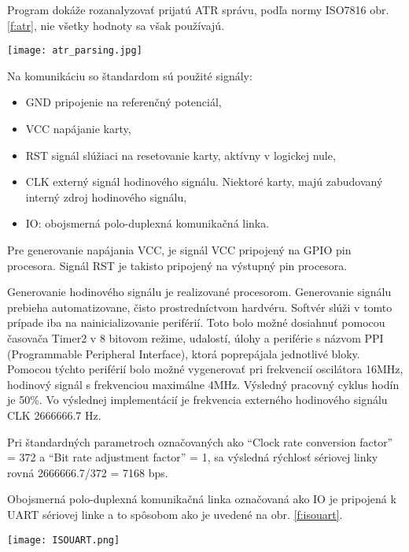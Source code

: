 \documentclass[12pt,a4paper,oneside,openright]{report}
\newcommand{\quotes}[1]{``#1''}
\begin{document}
	Program dokáže rozanalyzovať prijatú ATR správu, podľa normy ISO7816 obr. \ref{f:atr}, nie všetky hodnoty sa však používajú.

	\begin{figure*}[h]
		\centering
		\texttt{[image: atr\_parsing.jpg]}
		\caption{Analyzovanie ATR (Answer to reset) správy po pripojení smart karty\cite{smartcard}.}
		\label{f:atr}
	\end{figure*}

	Na komunikáciu so štandardom sú použité signály:
		\singlespacing
	\begin{itemize}
		\item GND pripojenie na referenčný potenciál,
		\item VCC napájanie karty,
		\item RST signál slúžiaci na resetovanie karty, aktívny v logickej nule,
		\item CLK externý signál hodinového signálu. Niektoré karty, majú zabudovaný interný zdroj hodinového signálu,
		\item IO: obojsmerná polo-duplexná komunikačná linka.
	\end{itemize}
	\onehalfspacing
	
	Pre generovanie napájania VCC, je signál VCC pripojený na GPIO pin procesora.
	Signál RST je takisto pripojený na výstupný pin procesora.
	
	Generovanie hodinového signálu je realizované procesorom. Generovanie signálu prebieha automatizovane, čisto prostredníctvom hardvéru. Softvér slúži v tomto prípade iba na nainicializovanie periférií. Toto bolo možné dosiahnuť pomocou časovača Timer2 v 8 bitovom režime, udalostí, úlohy a periférie s názvom PPI (Programmable Peripheral Interface), ktorá poprepájala jednotlivé bloky. Pomocou týchto periférií bolo možné vygenerovať pri frekvencií oscilátora 16MHz, hodinový signál s frekvenciou maximálne 4MHz. Výsledný pracovný cyklus hodín je 50\%. Vo výslednej implementácií je frekvencia externého hodinového signálu CLK 2666666.7 Hz.

	Pri štandardných parametroch označovaných ako \quotes{Clock rate conversion factor} = 372 a \quotes{Bit rate adjustment factor} = 1, sa výsledná rýchlosť sériovej linky rovná 2666666.7/372 = 7168 bps.

	Obojsmerná polo-duplexná komunikačná linka označovaná ako IO je pripojená k UART sériovej linke a to spôsobom ako je uvedené na obr. \ref{f:isouart}.

	\begin{figure*}[h]
		\centering
		\texttt{[image: ISOUART.png]}
		\caption{Pripojenie pinov RX a TX (UART) k pinu I/O (ISO7816).}
		\label{f:isouart}
	\end{figure*}
\end{document}
